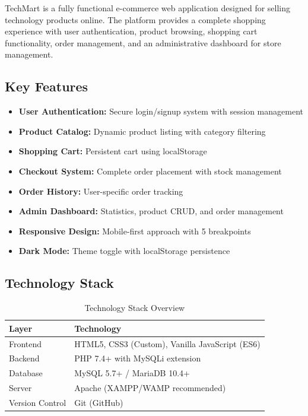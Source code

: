 \documentclass[12pt,a4paper]{article}
\begin{document}
TechMart is a fully functional e-commerce web application designed for selling technology products online. The platform provides a complete shopping experience with user authentication, product browsing, shopping cart functionality, order management, and an administrative dashboard for store management.

\subsection{Key Features}
\begin{itemize}[leftmargin=*]
    \item \textbf{User Authentication:} Secure login/signup system with session management
    \item \textbf{Product Catalog:} Dynamic product listing with category filtering
    \item \textbf{Shopping Cart:} Persistent cart using localStorage
    \item \textbf{Checkout System:} Complete order placement with stock management
    \item \textbf{Order History:} User-specific order tracking
    \item \textbf{Admin Dashboard:} Statistics, product CRUD, and order management
    \item \textbf{Responsive Design:} Mobile-first approach with 5 breakpoints
    \item \textbf{Dark Mode:} Theme toggle with localStorage persistence
\end{itemize}

\subsection{Technology Stack}
\begin{table}[H]
\centering
\begin{tabular}{@{}ll@{}}
\toprule
\textbf{Layer} & \textbf{Technology} \\
\midrule
Frontend & HTML5, CSS3 (Custom), Vanilla JavaScript (ES6) \\
Backend & PHP 7.4+ with MySQLi extension \\
Database & MySQL 5.7+ / MariaDB 10.4+ \\
Server & Apache (XAMPP/WAMP recommended) \\
Version Control & Git (GitHub) \\
\bottomrule
\end{tabular}
\caption{Technology Stack Overview}
\end{table}
\end{document}
